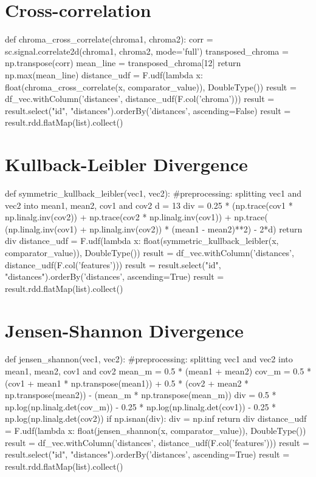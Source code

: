 \section{Cross-correlation}

\begin{pythonCode}
def chroma_cross_correlate(chroma1, chroma2):
    corr = sc.signal.correlate2d(chroma1, chroma2, mode='full') 
    transposed_chroma = np.transpose(corr)
    mean_line = transposed_chroma[12]
    return np.max(mean_line)
distance_udf = F.udf(lambda x: float(chroma_cross_correlate(x, comparator_value)), DoubleType())
result = df_vec.withColumn('distances', distance_udf(F.col('chroma')))
result = result.select("id", "distances").orderBy('distances', ascending=False)
result = result.rdd.flatMap(list).collect()
\end{pythonCode}


\section{Kullback-Leibler Divergence}

\begin{pythonCode}
def symmetric_kullback_leibler(vec1, vec2):
	#preprocessing: splitting vec1 and vec2 into mean1, mean2, cov1 and cov2
    d = 13
    div = 0.25 * (np.trace(cov1 * np.linalg.inv(cov2)) + np.trace(cov2 * np.linalg.inv(cov1)) + np.trace( (np.linalg.inv(cov1) + np.linalg.inv(cov2)) * (mean1 - mean2)**2) - 2*d)
    return div
distance_udf = F.udf(lambda x: float(symmetric_kullback_leibler(x, comparator_value)), DoubleType())
result = df_vec.withColumn('distances', distance_udf(F.col('features')))
result = result.select("id", "distances").orderBy('distances', ascending=True)
result = result.rdd.flatMap(list).collect()
\end{pythonCode}


\section{Jensen-Shannon Divergence}

\begin{pythonCode}
def jensen_shannon(vec1, vec2):
	#preprocessing: splitting vec1 and vec2 into mean1, mean2, cov1 and cov2
    mean_m = 0.5 * (mean1 + mean2)
    cov_m = 0.5 * (cov1 + mean1 * np.transpose(mean1)) + 0.5 * (cov2 + mean2 * np.transpose(mean2)) - (mean_m * np.transpose(mean_m))
    div = 0.5 * np.log(np.linalg.det(cov_m)) - 0.25 * np.log(np.linalg.det(cov1)) - 0.25 * np.log(np.linalg.det(cov2))  
    if np.isnan(div):
        div = np.inf
    return div
distance_udf = F.udf(lambda x: float(jensen_shannon(x, comparator_value)), DoubleType())
result = df_vec.withColumn('distances', distance_udf(F.col('features')))
result = result.select("id", "distances").orderBy('distances', ascending=True)
result = result.rdd.flatMap(list).collect()

\end{pythonCode}

